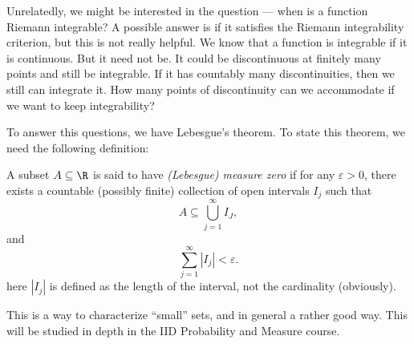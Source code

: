 \documentclass[a4paper]{article}
\begin{document}
Unrelatedly, we might be interested in the question --- when is a function Riemann integrable? A possible answer is if it satisfies the Riemann integrability criterion, but this is not really helpful. We know that a function is integrable if it is continuous. But it need not be. It could be discontinuous at finitely many points and still be integrable. If it has countably many discontinuities, then we still can integrate it. How many points of discontinuity can we accommodate if we want to keep integrability?

To answer this questions, we have Lebesgue's theorem. To state this theorem, we need the following definition:
\begin{defi}
  A subset $A\subseteq \R$ is said to have \emph{(Lebesgue) measure zero} if for any $\varepsilon > 0$, there exists a countable (possibly finite) collection of open intervals $I_j$ such that
  \[
    A \subseteq \bigcup_{j = 1}^\infty I_J,
  \]
  and
  \[
    \sum_{j = 1}^\infty | I_j| < \varepsilon.
  \]
  here $|I_j|$ is defined as the length of the interval, not the cardinality (obviously).
\end{defi}
This is a way to characterize ``small'' sets, and in general a rather good way. This will be studied in depth in the IID Probability and Measure course.
\end{document}
